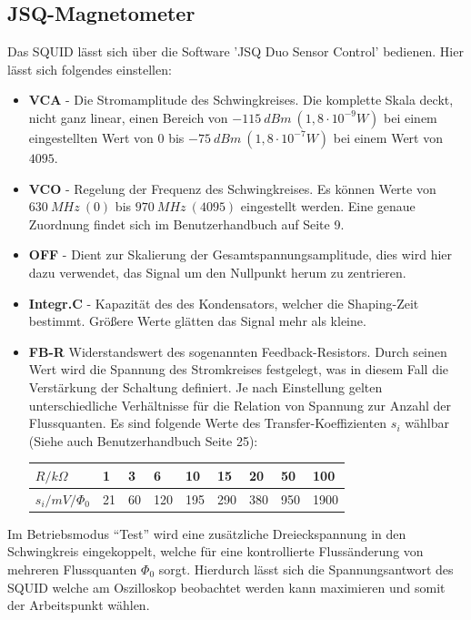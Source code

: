\documentclass[12pt]{article}
\begin{document}
\subsection{JSQ-Magnetometer}
\label{jsq}
Das SQUID lässt sich über die Software ’JSQ Duo Sensor Control’ bedienen. Hier lässt sich folgendes einstellen:
\begin{itemize}
 \item \textbf{VCA} - Die Stromamplitude des Schwingkreises. Die komplette Skala deckt, nicht ganz linear, einen
       Bereich von $-115~dBm ~(1, 8 \cdot 10^{-9} W)$ bei einem eingestellten Wert von $0$ bis $-75~ dBm ~(1,8 \cdot 10^{-7} W)$ bei einem Wert von $4095$.
 \item \textbf{VCO} - Regelung der Frequenz des Schwingkreises. Es können Werte von $630~MHz~(0)$ bis $970~MHz~(4095)$ eingestellt werden. Eine genaue
       Zuordnung findet sich im Benutzerhandbuch auf Seite 9.
 \item \textbf{OFF} - Dient zur Skalierung der Gesamtspannungsamplitude, dies wird hier dazu verwendet, das Signal um den Nullpunkt herum zu zentrieren.
 \item \textbf{Integr.C} - Kapazität des des Kondensators, welcher die Shaping-Zeit bestimmt. Größere Werte glätten das Signal mehr als kleine.
 \item \textbf{FB-R} Widerstandswert des sogenannten Feedback-Resistors. Durch seinen Wert wird die Spannung des Stromkreises festgelegt, was in
       diesem Fall die Verstärkung der Schaltung definiert. Je nach Einstellung gelten unterschiedliche Verhältnisse für die Relation von Spannung
       zur Anzahl der Flussquanten. Es sind folgende Werte des Transfer-Koeffizienten $s_i$ wählbar (Siehe auch Benutzerhandbuch Seite 25):
       \begin{center}
\begin{tabular}{|l|llllllll|}
\hline 
$R / k\Omega$ & 1 & 3 & 6 & 10 & 15 & 20 & 50 & 100\\
\hline 
$s_i / mV / \Phi_0$ & 21 & 60 & 120 & 195 & 290 & 380 & 950 & 1900\\
\hline 
       \end{tabular}
       \end{center}


\end{itemize}

Im Betriebsmodus "`Test"' wird eine zusätzliche Dreieckspannung in den Schwingkreis eingekoppelt, welche für eine kontrollierte Flussänderung von mehreren Flussquanten $\Phi_0$ sorgt. Hierdurch lässt sich die Spannungsantwort des SQUID welche am Oszilloskop beobachtet werden kann maximieren und somit der Arbeitspunkt wählen.\\
\end{document}

